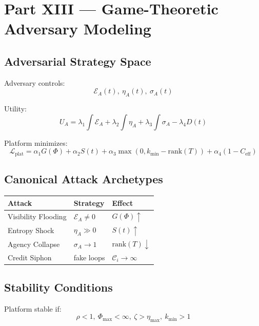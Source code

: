 \documentclass[11pt,a4paper]{article}
\theoremstyle{plain}
\theoremstyle{definition}
\theoremstyle{remark}
\begin{document}
\newpage

\section*{Part XIII — Game-Theoretic Adversary Modeling}

\subsection{Adversarial Strategy Space}

Adversary controls:
\[
\mathcal{E}_A(t),\ \eta_A(t),\ \sigma_A(t)
\]

Utility:
\[
U_A = \lambda_1 \int \mathcal{E}_A + \lambda_2 \int \eta_A + \lambda_3 \int \sigma_A - \lambda_4 D(t)
\]

Platform minimizes:
\[
\mathcal{L}_\text{plat} = \alpha_1 G(\Phi) + \alpha_2 S(t) + \alpha_3 \max(0, k_{\min}-\text{rank}(T)) + \alpha_4 (1 - C_{\text{eff}})
\]

\subsection{Canonical Attack Archetypes}

\begin{table}[H]
\centering
\begin{tabular}{l l l}
\toprule
Attack & Strategy & Effect \\
\midrule
Visibility Flooding & $\mathcal{E}_A \ne 0$ & $G(\Phi)\uparrow$ \\
Entropy Shock & $\eta_A \gg 0$ & $S(t)\uparrow$ \\
Agency Collapse & $\sigma_A \rightarrow 1$ & $\text{rank}(T) \downarrow$ \\
Credit Siphon & fake loops & $\mathcal{C}_i \rightarrow \infty$ \\
\bottomrule
\end{tabular}
\end{table}

\subsection{Stability Conditions}

Platform stable if:
\[
\rho < 1,\ \Phi_{\max} < \infty,\ \zeta > \eta_{\max},\ k_{\min} > 1
\]
\end{document}
